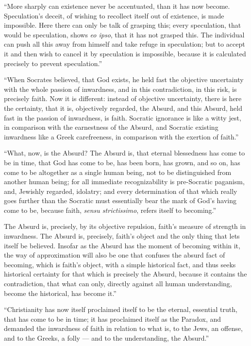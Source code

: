 \documentclass[12pt]{book}
\begin{document}
``More sharply can existence never be accentuated, than it has now become. Speculation's deceit, of wishing to recollect itself out of existence, is made impossible. Here there can only be talk of grasping this; every speculation, that would be speculation, shows \textit{eo ipso}, that it has not grasped this. The individual can push all this away from himself and take refuge in speculation; but to accept it and then wish to cancel it by speculation is impossible, because it is calculated precisely to prevent speculation.''

``When Socrates believed, that God exists, he held fast the objective uncertainty with the whole passion of inwardness, and in this contradiction, in this risk, is precisely faith. Now it is different: instead of objective uncertainty, there is here the certainty, that it is, objectively regarded, the Absurd, and this Absurd, held fast in the passion of inwardness, is faith. Socratic ignorance is like a witty jest, in comparison with the earnestness of the Absurd,
and Socratic existing inwardness like a Greek carefreeness, in comparison with the exertion of faith.''

``What, now, is the Absurd? The Absurd is, that eternal blessedness has come to be in time, that God has come to be, has been born, has grown, and so on, has come to be altogether as a single human being, not to be distinguished from another human being; for all immediate recognizability is pre-Socratic paganism, and, Jewishly regarded, idolatry; and every determination of that which really goes further than the Socratic must essentially bear the mark of God's having come to be, because faith, \textit{sensu strictissimo}, refers itself to becoming.''

The Absurd is, precisely, by its objective repulsion, faith's measure of strength in inwardness. The Absurd is, precisely, faith's object and the only thing that lets itself be believed. Insofar as the Absurd has the moment of becoming within it, the way of approximation will also be one that confuses the absurd fact of becoming, which is faith's object, with a simple historical fact, and thus seeks historical certainty for that which is precisely the Absurd, because it contains the contradiction, that what can only, directly against all human understanding, become the historical, has become it.''

``Christianity has now itself proclaimed itself to be the eternal, essential truth, that has come to be in time; it has proclaimed itself as the Paradox, and demanded the inwardness of faith
in relation to what is, to the Jews, an offense, and to the Greeks, a folly --- and to the understanding, the Absurd.''
\end{document}
